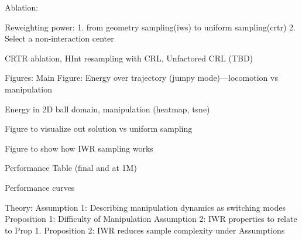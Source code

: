 Ablation:

Reweighting power: 
1. from geometry sampling(iws) to uniform sampling(crtr)
2. Select a non-interaction center

CRTR ablation, HInt resampling with CRL, Unfactored CRL (TBD)

Figures:
Main Figure: Energy over trajectory (jumpy mode)---locomotion vs manipulation

Energy in 2D ball domain, manipulation (heatmap, tsne)

Figure to visualize out solution vs uniform sampling

Figure to show how IWR sampling works

Performance Table (final and at 1M)

Performance curves

Theory: 
Assumption 1: Describing manipulation dynamics as switching modes
Proposition 1: Difficulty of Manipulation
Assumption 2: IWR properties to relate to Prop 1. 
Proposition 2: IWR reduces sample complexity under Assumptions

